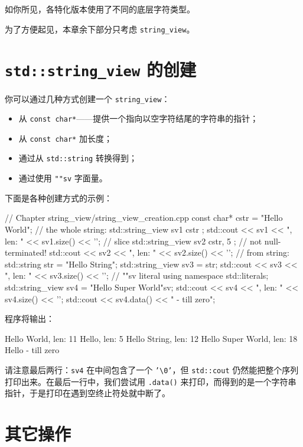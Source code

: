 如你所见，各特化版本使用了不同的底层字符类型。

为了方便起见，本章余下部分只考虑 \texttt{string\_view}。

\section{\texttt{std::string\_view} 的创建}

你可以通过几种方式创建一个 \texttt{string\_view}：

\begin{itemize}
\item 从 \texttt{const char*}——提供一个指向以空字符结尾的字符串的指针；
\item 从 \texttt{const char*} 加长度；
\item 通过从 \texttt{std::string} 转换得到；
\item 通过使用 \texttt{""sv} 字面量。
\end{itemize}

下面是各种创建方式的示例：

\begin{codebox}[cpp]
// Chapter string_view/string_view_creation.cpp
const char* cstr = "Hello World";
// the whole string:
std::string_view sv1 { cstr };
std::cout << sv1 << ", len: " << sv1.size() << '\n';
// slice
std::string_view sv2 { cstr, 5 }; // not null-terminated!
std::cout << sv2 << ", len: " << sv2.size() << '\n';
// from string:
std::string str = "Hello String";
std::string_view sv3 = str;
std::cout << sv3 << ", len: " << sv3.size() << '\n';
// ""sv literal
using namespace std::literals;
std::string_view sv4 = "Hello\0 Super World"sv;
std::cout << sv4 << ", len: " << sv4.size() << '\n';
std::cout << sv4.data() << " - till zero\n";
\end{codebox}

程序将输出：

\begin{codebox}
Hello World, len: 11
Hello, len: 5
Hello String, len: 12
Hello Super World, len: 18
Hello - till zero
\end{codebox}

请注意最后两行：\texttt{sv4} 在中间包含了一个 \texttt{'\textbackslash0'}，但 \texttt{std::cout} 仍然能把整个序列打印出来。在最后一行中，我们尝试用 \texttt{.data()} 来打印，而得到的是一个字符串指针，于是打印在遇到空终止符处就中断了。

\section{其它操作}

